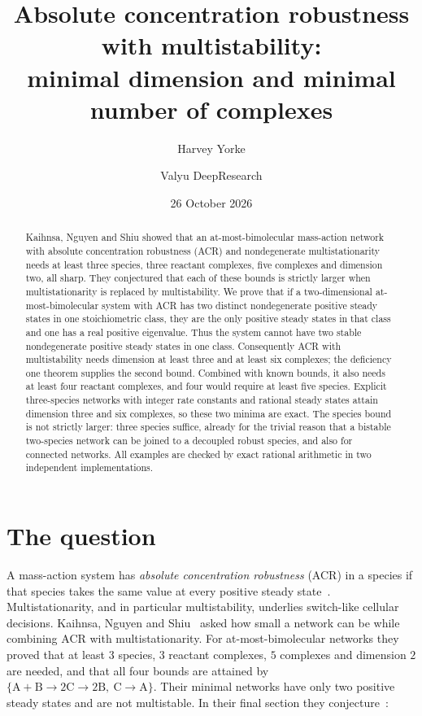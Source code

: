 \documentclass[11pt]{amsart}
\title[ACR with multistability]{Absolute concentration robustness with multistability:\\ minimal dimension and minimal number of complexes}
\author{Harvey Yorke}
\author{Valyu DeepResearch}
\date{26 October 2026}
\theoremstyle{definition}
\theoremstyle{remark}
\newcommand{\ce}[1]{\mathrm{#1}}
\begin{document}
\raggedbottom
\begin{abstract}
Kaihnsa, Nguyen and Shiu showed that an at-most-bimolecular mass-action network with absolute concentration robustness (ACR) and nondegenerate multistationarity needs at least three species, three reactant complexes, five complexes and dimension two, all sharp. They conjectured that each of these bounds is strictly larger when multistationarity is replaced by multistability. We prove that if a two-dimensional at-most-bimolecular system with ACR has two distinct nondegenerate positive steady states in one stoichiometric class, they are the only positive steady states in that class and one has a real positive eigenvalue. Thus the system cannot have two stable nondegenerate positive steady states in one class. Consequently ACR with multistability needs dimension at least three and at least six complexes; the deficiency one theorem supplies the second bound. Combined with known bounds, it also needs at least four reactant complexes, and four would require at least five species. Explicit three-species networks with integer rate constants and rational steady states attain dimension three and six complexes, so these two minima are exact. The species bound is not strictly larger: three species suffice, already for the trivial reason that a bistable two-species network can be joined to a decoupled robust species, and also for connected networks. All examples are checked by exact rational arithmetic in two independent implementations.
\end{abstract}
\maketitle

\section{The question}

A mass-action system has \emph{absolute concentration robustness} (ACR) in a species if that species takes the same value at every positive steady state~\cite{shinarFeinberg2010}. Multistationarity, and in particular multistability, underlies switch-like cellular decisions. Kaihnsa, Nguyen and Shiu~\cite{kns2024} asked how small a network can be while combining ACR with multistationarity. For at-most-bimolecular networks they proved that at least $3$ species, $3$ reactant complexes, $5$ complexes and dimension $2$ are needed, and that all four bounds are attained by $\{\ce{A}+\ce{B}\to2\ce{C}\to2\ce{B},\ \ce{C}\to\ce{A}\}$. Their minimal networks have only two positive steady states and are not multistable. In their final section they conjecture~\cite[Section~6]{kns2024}:
\end{document}
